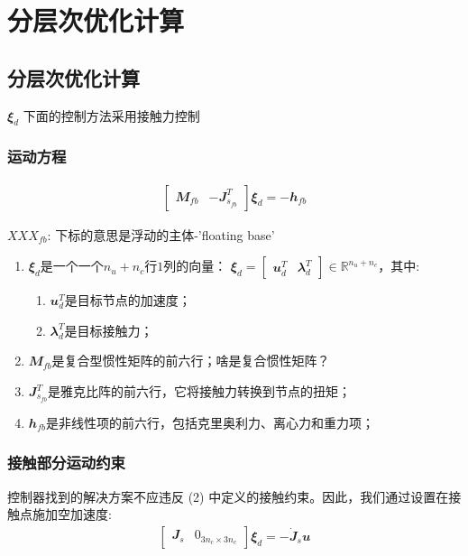 
\chapter{分层次优化计算}


\section{分层次优化计算}
${\mathbfit \xi}_d$
下面的控制方法采用接触力控制

\subsection{运动方程}
\begin{align}
    \begin{bmatrix}{\mathbfit M}_{fb} & - {\mathbfit J}_{s_{fb}}^T \end{bmatrix} {\mathbfit \xi}_d = - {\mathbfit h}_{fb}
\end{align}

\begin{note}
    $XXX_{fb}$: 下标的意思是浮动的主体-'floating base'
\end{note}

\begin{enumerate}
    \item ${\mathbfit \xi}_d$是一个一个$n_u+n_c$行$1$列的向量： ${\mathbfit \xi}_d = \begin{bmatrix} {\mathbfit u}_d^T & {\mathbfit \lambda}_d^T \end{bmatrix} \in {\mathbb R}^{n_u+n_c}$，其中:
    \begin{enumerate}
        \item ${\mathbfit u}_d^T$是目标节点的加速度；
        \item ${\mathbfit \lambda}_d^T$是目标接触力；
    \end{enumerate}
    \item ${\mathbfit M}_{fb}$是复合型惯性矩阵的前六行；啥是复合惯性矩阵？
    \item ${\mathbfit J}_{s_{fb}}^T$是雅克比阵的前六行，它将接触力转换到节点的扭矩；
    \item ${\mathbfit h}_{fb}$是非线性项的前六行，包括克里奥利力、离心力和重力项；
\end{enumerate}
\subsection{接触部分运动约束}
控制器找到的解决方案不应违反 (2) 中定义的接触约束。因此，我们通过设置在接触点施加空加速度:
\begin{align}
    \begin{bmatrix} {\mathbfit J}_s & {\mathbfit 0}_{3n_c \times 3n_c}\end{bmatrix} {\mathbfit \xi}_d = - \dot {\mathbfit J}_s {\mathbfit u} 
\end{align}


